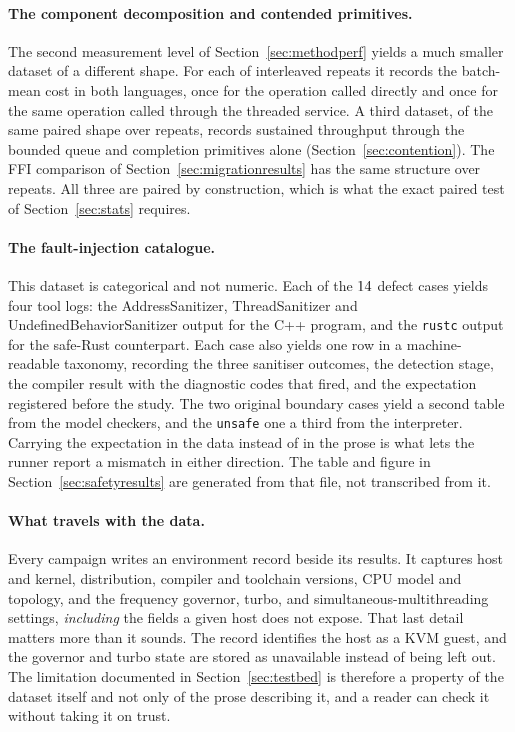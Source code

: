 \documentclass[english,oneside,a4paper,censored,csm,software-track-2020]{HYthesisML}
\begin{document}
\paragraph{The component decomposition and contended primitives.}
The second measurement level of Section~\ref{sec:methodperf} yields a much smaller dataset of a
different shape. For each of \BudgetRepeats{} interleaved repeats it records the batch-mean cost
in both languages, once for the operation called directly and once for the same operation called
through the threaded
service. A third dataset, of the same paired shape over \ContentionRepeats{} repeats, records
sustained throughput through the bounded queue and completion primitives alone
(Section~\ref{sec:contention}). The FFI comparison of Section~\ref{sec:migrationresults} has the
same structure over \FfiOpRepeats{} repeats. All three are paired by construction, which is what
the exact paired test of Section~\ref{sec:stats} requires.

\paragraph{The fault-injection catalogue.}
This dataset is categorical and not numeric. Each of the $14$ defect cases yields four
tool
logs: the AddressSanitizer, ThreadSanitizer and UndefinedBehaviorSanitizer output for the C++
program, and the \texttt{rustc} output for the safe-Rust counterpart. Each case also yields one
row in a machine-readable taxonomy, recording the three sanitiser outcomes, the detection stage,
the compiler result with the diagnostic codes that fired, and the expectation registered before
the study. The two original boundary cases yield a second table from the model checkers, and the
\texttt{unsafe} one a third from the interpreter. Carrying
the expectation in the data instead of in the prose is what lets the runner report a mismatch
in either direction. The table and figure in Section~\ref{sec:safetyresults} are generated from
that file, not transcribed from it.

\paragraph{What travels with the data.}
Every campaign writes an environment record beside its results. It captures host and kernel,
distribution, compiler and toolchain versions, CPU model and topology, and the frequency
governor, turbo, and simultaneous-multithreading settings, \emph{including} the fields a given
host does not expose. That last detail matters more than it sounds. The record identifies the host
as a KVM guest, and the governor and turbo state are stored as unavailable instead of being left
out. The limitation documented in Section~\ref{sec:testbed} is therefore a property of the dataset
itself and not only of the prose describing it, and a reader can check it without taking it on trust.
\end{document}
